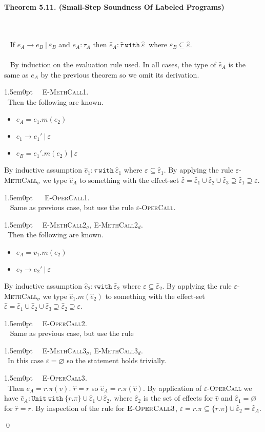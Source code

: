 \documentclass{llncs}
\newcommand{\keywadj}[1]{\mathtt{#1}}
\newcommand{\keyw}[1]{\keywadj{#1}~}
\newcommand{\thm}[3]{
	\begin{large}
		\bf{#1}
	\end{large} \\\\
	\fbox{Statement.} ~ #2
	\fbox{Proof.}~ #3 \qed
}
\newcommand{\proofcase}[2]{
	\begin{adjustwidth}{1.5em}{0pt}
		\fbox{Case.}~~#1. \\ ~#2
	\end{adjustwidth}
}
\begin{document}
\thm{Theorem 5.11. (Small-Step Soundness Of Labeled Programs)}
{If $e_A \longrightarrow e_B~|~\varepsilon_B$ and $e_A : \tau_A$ then $\hat e_A : \hat \tau~\keyw{with ~\hat \varepsilon}$ where $\varepsilon_B \subseteq \hat \varepsilon$.\\\\}
{By induction on the evaluation rule used. In all cases, the type of $\hat e_A$ is the same as $e_A$ by the previous theorem so we omit its derivation.

\proofcase{\textsc{E-MethCall1}}
{Then the following are known.
\begin{itemize}
	\item $e_A = e_1.m(e_2)$
	\item $e_1 \rightarrow e_1'~|~\varepsilon$
	\item $e_B = e_1'.m(e_2)~|~\varepsilon$
\end{itemize}
By inductive assumption $\hat e_1 : \tau~ \keyw{with} \hat \varepsilon_1$ where $\varepsilon \subseteq \hat \varepsilon_1$. By applying the rule \textsc{$\varepsilon$-MethCall$_\sigma$} we type $\hat e_A$ to something with the effect-set $\hat \varepsilon = \hat \varepsilon_1 \cup \hat \varepsilon_2 \cup \hat \varepsilon_3 \supseteq \hat \varepsilon_1 \supseteq \varepsilon$.
}

\proofcase{ \textsc{E-OperCall1}}
{
	Same as previous case, but use the rule \textsc{$\varepsilon$-OperCall}.
}

\proofcase{\textsc{E-MethCall2$_\sigma$}, \textsc{E-MethCall2$_d$}}
{Then the following are known.
\begin{itemize}
	\item $e_A = v_1.m(e_2)$
	\item $e_2 \longrightarrow e_2'~|~\varepsilon$
\end{itemize}
By inductive assumption $\hat e_2 : \tau \keyw{with} \hat \varepsilon_2$ where $\varepsilon \subseteq \hat \varepsilon_2$. By applying the rule \textsc{$\varepsilon$-MethCall$_\sigma$} we type $\hat e_1.m(\hat e_2)$ to something with the effect-set $\hat \varepsilon = \hat \varepsilon_1 \cup \hat \varepsilon_2 \cup \hat \varepsilon_3 \supseteq \hat \varepsilon_2 \supseteq \varepsilon$.
}

\proofcase{\textsc{E-OperCall2}} {
	Same as previous case, but use the rule
}

\proofcase{\textsc{E-MethCall3$_\sigma$}, \textsc{E-MethCall3$_d$}}
{In this case $\varepsilon = \varnothing$ so the statement holds trivially.
}

\proofcase{\textsc{E-OperCall3}}
{Then $e_A = r.\pi(v)$. $\hat r = r$ so $\hat e_A = r.\pi(\hat v)$. By application of \textsc{$\varepsilon$-OperCall} we have $\hat e_A : \keyw{Unit~with} \{ r.\pi \} \cup \hat \varepsilon_1 \cup \hat \varepsilon_2$, where $\hat \varepsilon_2$ is the set of effects for $\hat v$ and $\hat \varepsilon_1 = \varnothing$ for $\hat r = r$. By inspection of the rule for $\textsc{E-OperCall3}$, $\varepsilon = r.\pi \subseteq \{ r.\pi \} \cup \hat \varepsilon_2 = \hat \varepsilon_A$.
}
}
\end{document}
